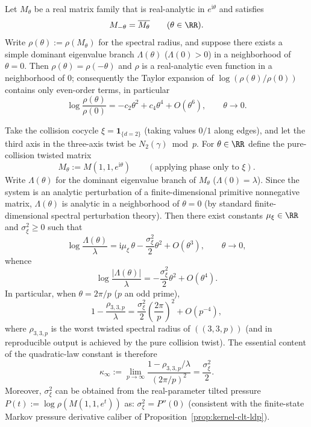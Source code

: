 \begin{remark}\label{lem:unit-circle-evenness}
Let $M_\theta$ be a real matrix family that is real-analytic in $e^{\mathrm{i}\theta}$ and satisfies
\[
M_{-\theta}=\overline{M_\theta}\qquad(\theta\in\RR).
\]
Write $\rho(\theta):=\rho(M_\theta)$ for the spectral radius, and suppose there exists a simple dominant eigenvalue branch $\Lambda(\theta)$ ($\Lambda(0)>0$) in a neighborhood of $\theta=0$.
Then \(\rho(\theta)=\rho(-\theta)\) and \(\rho\) is a real-analytic even function in a neighborhood of \(0\); consequently the Taylor expansion of \(\log(\rho(\theta)/\rho(0))\) contains only even-order terms, in particular
\[
\log\frac{\rho(\theta)}{\rho(0)}=-c_2\theta^2+c_4\theta^4+O(\theta^6),
\qquad \theta\to 0.
\]
\end{remark}

\begin{remark}\label{prop:arity-335-kappa-variance}
Take the collision cocycle \(\xi=\mathbf{1}_{\{d=2\}}\) (taking values \(0/1\) along edges), and let the third axis in the three-axis twist be \(N_2(\gamma)\bmod p\).
For \(\theta\in\RR\) define the pure-collision twisted matrix
$$
M_\theta:=M(1,1,e^{\mathrm{i}\theta})\qquad(\text{applying phase only to }\xi).
$$
Write \(\Lambda(\theta)\) for the dominant eigenvalue branch of \(M_\theta\) (\(\Lambda(0)=\lambda\)).
Since the system is an analytic perturbation of a finite-dimensional primitive nonnegative matrix, \(\Lambda(\theta)\) is analytic in a neighborhood of \(\theta=0\) (by standard finite-dimensional spectral perturbation theory).
Then there exist constants \(\mu_\xi\in\RR\) and \(\sigma_\xi^2\ge 0\) such that
$$
\log\frac{\Lambda(\theta)}{\lambda}
=
\mathrm{i}\mu_\xi\,\theta-\frac{\sigma_\xi^2}{2}\theta^2+O(\theta^3),
\qquad \theta\to 0,
$$
whence
$$
\log\frac{|\Lambda(\theta)|}{\lambda}
=
-\frac{\sigma_\xi^2}{2}\theta^2+O(\theta^4).
$$
In particular, when \(\theta=2\pi/p\) (\(p\) an odd prime),
$$
1-\frac{\rho_{3,3,p}}{\lambda}
=
\frac{\sigma_\xi^2}{2}\left(\frac{2\pi}{p}\right)^2
+
O\!\left(p^{-4}\right),
$$
where \(\rho_{3,3,p}\) is the worst twisted spectral radius of \( ((3,3,p))\) (and in reproducible output is achieved by the pure collision twist).
The essential content of the quadratic-law constant is therefore
$$
\kappa_\infty:=\lim_{p\to\infty}\frac{1-\rho_{3,3,p}/\lambda}{(2\pi/p)^2}
=\frac{\sigma_\xi^2}{2}.
$$
Moreover, \(\sigma_\xi^2\) can be obtained from the real-parameter tilted pressure
\(
P(t):=\log\rho(M(1,1,e^t))
\)
as: \(\sigma_\xi^2=P''(0)\) (consistent with the finite-state Markov pressure derivative caliber of Proposition~\ref{prop:kernel-clt-ldp}).
\end{remark}

